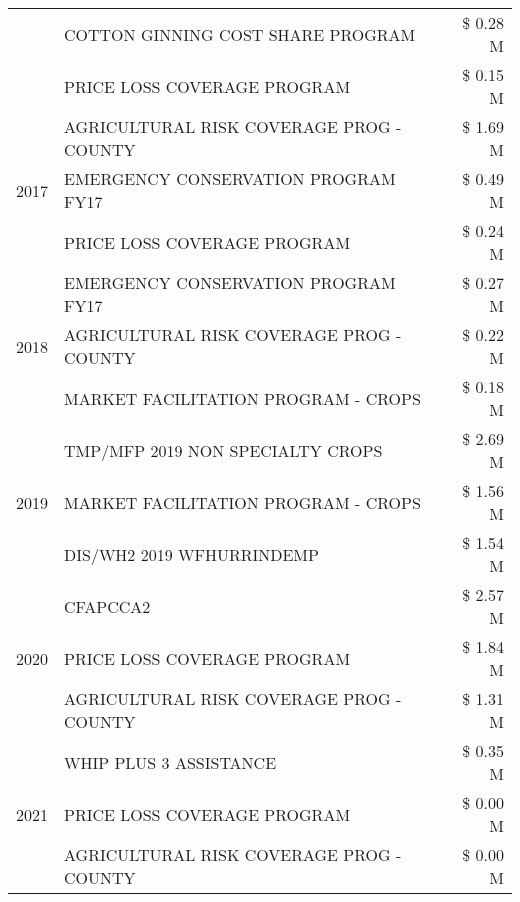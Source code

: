 \begin{tabular}{llr}
 & COTTON GINNING COST SHARE PROGRAM & \$ 0.28 M \\
 & PRICE LOSS COVERAGE PROGRAM & \$ 0.15 M \\
\cline{1-3}
\multirow[t]{3}{*}{2017} & AGRICULTURAL RISK COVERAGE PROG - COUNTY & \$ 1.69 M \\
 & EMERGENCY CONSERVATION PROGRAM FY17 & \$ 0.49 M \\
 & PRICE LOSS COVERAGE PROGRAM & \$ 0.24 M \\
\cline{1-3}
\multirow[t]{3}{*}{2018} & EMERGENCY CONSERVATION PROGRAM FY17 & \$ 0.27 M \\
 & AGRICULTURAL RISK COVERAGE PROG - COUNTY & \$ 0.22 M \\
 & MARKET FACILITATION PROGRAM - CROPS & \$ 0.18 M \\
\cline{1-3}
\multirow[t]{3}{*}{2019} & TMP/MFP 2019 NON SPECIALTY CROPS & \$ 2.69 M \\
 & MARKET FACILITATION PROGRAM - CROPS & \$ 1.56 M \\
 & DIS/WH2 2019 WFHURRINDEMP & \$ 1.54 M \\
\cline{1-3}
\multirow[t]{3}{*}{2020} & CFAPCCA2 & \$ 2.57 M \\
 & PRICE LOSS COVERAGE PROGRAM & \$ 1.84 M \\
 & AGRICULTURAL RISK COVERAGE PROG - COUNTY & \$ 1.31 M \\
\cline{1-3}
\multirow[t]{3}{*}{2021} & WHIP PLUS 3 ASSISTANCE & \$ 0.35 M \\
 & PRICE LOSS COVERAGE PROGRAM & \$ 0.00 M \\
 & AGRICULTURAL RISK COVERAGE PROG - COUNTY & \$ 0.00 M \\
\cline{1-3}
\bottomrule
\end{tabular}
